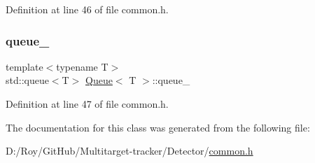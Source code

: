 Definition at line 46 of file common.\+h.

\mbox{\label{class_queue_a60e7a5aba900b055cd0668755c0dfadd}} 
\subsubsection{\texorpdfstring{queue\+\_\+}{queue\_}}
{\footnotesize\ttfamily template$<$typename T$>$ \\
std\+::queue$<$T$>$ \mbox{\hyperlink{class_queue}{Queue}}$<$ T $>$\+::queue\+\_\+\hspace{0.3cm}{\ttfamily [private]}}



Definition at line 47 of file common.\+h.



The documentation for this class was generated from the following file\+:\begin{DoxyCompactItemize}
\item 
D\+:/\+Roy/\+Git\+Hub/\+Multitarget-\/tracker/\+Detector/\mbox{\hyperlink{common_8h}{common.\+h}}\end{DoxyCompactItemize}
